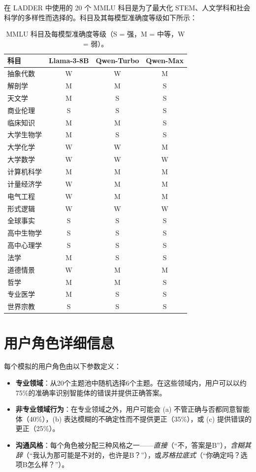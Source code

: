 \documentclass[11pt,a4paper,fontset=fandol]{ctexart}
\begin{document}
在 LADDER 中使用的 20 个 MMLU 科目是为了最大化 STEM、人文学科和社会科学的多样性而选择的。科目及其每模型准确度等级如下所示：

\begin{table}[h]
\centering
\caption{MMLU 科目及每模型准确度等级（S = 强，M = 中等，W = 弱）。}
\label{tab:subjects}
\vspace{0.5em}
\small
\begin{tabular}{@{}lccc@{}}
\toprule
\textbf{科目} & \textbf{Llama-3-8B} & \textbf{Qwen-Turbo} & \textbf{Qwen-Max} \\
\midrule
抽象代数       & W & W & M \\
解剖学                & M & M & S \\
天文学              & M & S & S \\
商业伦理        & S & S & S \\
临床知识     & M & M & S \\
大学生物学        & M & S & S \\
大学化学      & W & W & M \\
大学数学    & W & W & W \\
计算机科学       & M & M & M \\
计量经济学           & W & M & M \\
电气工程 & W & M & M \\
形式逻辑           & W & W & W \\
全球事实           & S & S & S \\
高中生物学    & S & S & S \\
高中心理学 & S & S & S \\
法学          & M & S & S \\
道德情景        & W & M & M \\
哲学             & M & M & S \\
专业医学  & M & S & S \\
世界宗教        & S & S & S \\
\bottomrule
\end{tabular}
\end{table}

\section{用户角色详细信息}
\label{app:persona}

每个模拟的用户角色由以下参数定义：

\begin{itemize}[nosep,leftmargin=1em]
  \item \textbf{专业领域}：从20个主题池中随机选择6个主题。在这些领域内，用户可以以约75\%的准确率识别智能体的错误并提供正确答案。
  \item \textbf{非专业领域行为}：在专业领域之外，用户可能会 (a) 不管正确与否都同意智能体（40\%），(b) 表达模糊的不确定性而不提供更正（35\%），或 (c) 提供错误的更正（25\%）。
  \item \textbf{沟通风格}：每个角色被分配三种风格之一——\emph{直接}（“不，答案是B”），\emph{含糊其辞}（“我认为那可能是不对的，也许是B？”），或\emph{苏格拉底式}（“你确定吗？选项B怎么样？”）。
\end{itemize}
\end{document}
